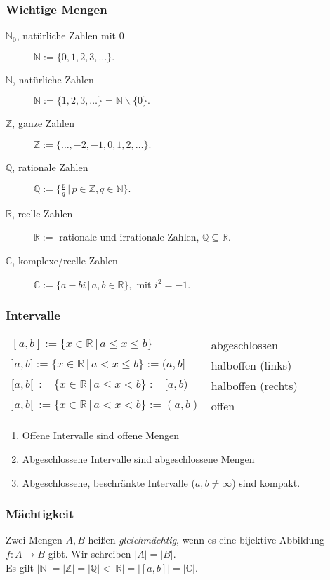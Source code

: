 \documentclass[a4paper, 9pt, DIV=24]{scrartcl}
\newcommand{\N}{\mathbb{N}}
\begin{document}
\subsubsection{Wichtige Mengen}
\begin{description}
 \item[$\N_0$, natürliche Zahlen mit 0] $\N := \{0,1,2,3,\dots\}.$
 \item[$\N$, natürliche Zahlen] $\N := \{1,2,3,\dots\} = \N\backslash\{0\}.$
 \item[$\mathbb{Z}$, ganze Zahlen] $\mathbb{Z} := \{\dots,-2,-1,0,1,2,\dots\}.$
 \item[$\mathbb{Q}$, rationale Zahlen] $\mathbb{Q} := \{\frac{p}{q}\, |\, p \in \mathbb{Z}, q \in \N \} .$
 \item[$\mathbb{R}$, reelle Zahlen] $\mathbb{R} := $ rationale und irrationale Zahlen, $\mathbb{Q} \subseteq \mathbb{R}$.
 \item[$\mathbb{C}$, komplexe/reelle Zahlen] $\mathbb{C} := \{a - bi\, |\, a, b \in \mathbb{R}\}, $ mit $i^2 = -1$.
\end{description}
\subsubsection{Intervalle}
\begin{tabular}{ll}
$[a,b] := \{x\in\mathbb{R}\, |\, a \leq x \leq b\}$ & abgeschlossen \\
$]a,b] := \{x\in\mathbb{R}\, |\, a < x \leq b\} := (a,b]$ & halboffen (links) \\
$[a,b[\ := \{x\in\mathbb{R}\, |\, a \leq x < b\} := [a,b)$ & halboffen (rechts) \\
$]a,b[\ := \{x\in\mathbb{R}\, |\, a < x < b\} := (a,b)$ & offen \\
\end{tabular}
\begin{enumerate}[label={(}\arabic*{)}]
 \item Offene Intervalle sind offene Mengen
 \item Abgeschlossene Intervalle sind abgeschlossene Mengen
 \item Abgeschlossene, beschränkte Intervalle ($a,b \neq \infty$) sind kompakt.
\end{enumerate}
\subsubsection{Mächtigkeit}
Zwei Mengen $A, B$ heißen \emph{gleichmächtig}, wenn es eine bijektive Abbildung $f: A \rightarrow B$ gibt.
Wir schreiben $|A| = |B|$. \\
Es gilt $|\N| = |\mathbb{Z}| = |\mathbb{Q}| < |\mathbb{R}| = |[a,b]| = |\mathbb{C}|$.
\end{document}
